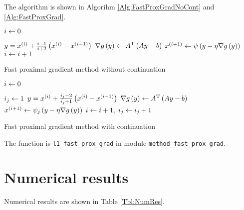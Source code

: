 \documentclass[english]{pkupaper}
\begin{document}
\begin{thmquestion}[3 (f)]
The algorithm is shown in Algorihm \ref{Alg:FastProxGradNoCont} and \ref{Alg:FastProxGrad}.

\begin{algorithm}
\SetAlgoLined


$ i \leftarrow 0 $\;

{
	$ y = x^{\left( i \right)} + \frac{ i - 1 }{ i + 2 } \left(  x^{\left( i \right)} - x^{\left(  i - 1  \right)}  \right) $\;
	$ \nabla g \left( y \right) \leftarrow A^{\mathrm{T}} \left(  A y - b  \right) $\;
	$ x^{\left(  i + 1  \right)} \leftarrow \psi \left(  y - \eta \nabla g \left( y \right)  \right) $\;
	$ i \leftarrow i + 1 $\;
}

\caption{Fast proximal gradient method without continuation} \label{Alg:FastProxGradNoCont}
\end{algorithm}

\begin{algorithm}
\SetAlgoLined


$ i \leftarrow 0 $\;

{
	$ i_j \leftarrow 1 $\;
	{
		$ y = x^{\left( i \right)} + \frac{ i_j - 2 }{ i_j + 1 } \left(  x^{\left( i \right)} - x^{\left(  i - 1  \right)}  \right) $\;
		$ \nabla g \left( y \right) \leftarrow A^{\mathrm{T}} \left(  A y - b  \right) $\;
		$ x^{\left(  i + 1  \right)} \leftarrow \psi_j \left(  y - \eta \nabla g \left( y \right)  \right) $\;
		$ i \leftarrow i + 1 $, $ i_j \leftarrow i_j + 1 $\;
	}
}

\caption{Fast proximal gradient method with continuation} \label{Alg:FastProxGrad}
\end{algorithm}

The function is \verb"l1_fast_prox_grad" in module \verb"method_fast_prox_grad".
\end{thmquestion}

\section{Numerical results}

Numerical results are shown in Table \ref{Tbl:NumRes}.
\end{document}

